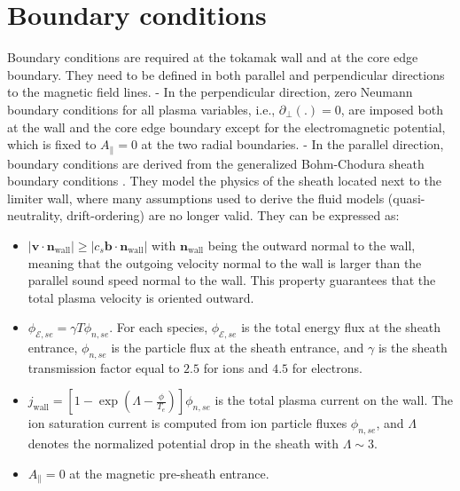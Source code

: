 \section{Boundary conditions}


Boundary conditions are required at the tokamak wall and at the core edge boundary. They need to be defined in both parallel and perpendicular directions to the magnetic field lines. \newline
- In the perpendicular direction, zero Neumann boundary conditions for all plasma variables, i.e., $\partial_{\perp} (.)=0$, are imposed both at the wall and the core edge boundary except for the electromagnetic potential, which is fixed to $A_\parallel=0$ at the two radial boundaries. \newline
- In the parallel direction, boundary conditions are derived from the generalized Bohm-Chodura sheath boundary conditions \cite{Stangeby_2000}. They model the physics of the sheath located next to the limiter wall, where many assumptions used to derive the fluid models (quasi-neutrality, drift-ordering) are no longer valid. They can be expressed as: \newline

\begin{itemize}
	\item $|\boldsymbol{v}\cdot \boldsymbol{n}_\text{wall} | \ge | c_s \boldsymbol{b}\cdot \boldsymbol{n}_\text{wall} |$ with $\boldsymbol{n}_\text{wall}$ being the outward normal to the wall, meaning that the outgoing velocity normal to the wall is larger than the parallel sound speed normal to the wall. This property guarantees that the total plasma velocity is oriented outward.
	\item $\phi_{\mathcal{E},se} =  \gamma T \phi_{n,se}$. For each species, $\phi_{\mathcal{E},se}$ is the total energy flux at the sheath entrance, $\phi_{n,se}$ is the particle flux at the sheath entrance, and $\gamma$ is the sheath transmission factor equal to $2.5$ for ions and $4.5$ for electrons.
	\item $j_\text{wall} = \left[1 - \exp\left( \Lambda - \frac{\phi}{T_e} \right) \right] \phi_{n,se}$ is the total plasma current on the wall. The ion saturation current is computed from ion particle fluxes $\phi_{n,se}$, and $\Lambda$ denotes the normalized potential drop in the sheath with $\Lambda \sim 3$.
	\item $A_{\parallel}=0$ at the magnetic pre-sheath entrance.
\end{itemize}





